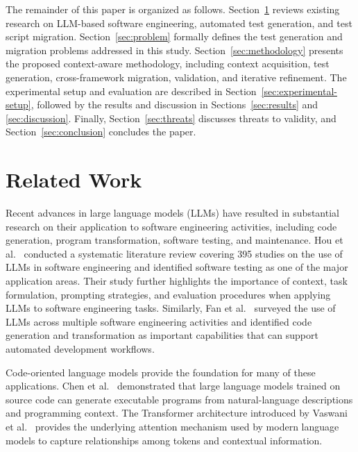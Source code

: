 \documentclass[pdflatex,sn-mathphys-num]{sn-jnl}
\begin{document}
The remainder of this paper is organized as follows. Section~\ref{sec:related-work}
reviews existing research on LLM-based software engineering, automated test
generation, and test script migration. Section~\ref{sec:problem} formally
defines the test generation and migration problems addressed in this study.
Section~\ref{sec:methodology} presents the proposed context-aware methodology,
including context acquisition, test generation, cross-framework migration,
validation, and iterative refinement. The experimental setup and evaluation
are described in Section~\ref{sec:experimental-setup}, followed by the
results and discussion in Sections~\ref{sec:results} and
\ref{sec:discussion}. Finally, Section~\ref{sec:threats} discusses threats to
validity, and Section~\ref{sec:conclusion} concludes the paper.


\section{Related Work}
\label{sec:related-work}

Recent advances in large language models (LLMs) have resulted in
substantial research on their application to software engineering
activities, including code generation, program transformation, software
testing, and maintenance. Hou et al.~\cite{hou2024llmslr} conducted a
systematic literature review covering 395 studies on the use of LLMs in
software engineering and identified software testing as one of the major
application areas. Their study further highlights the importance of
context, task formulation, prompting strategies, and evaluation procedures
when applying LLMs to software engineering tasks. Similarly,
Fan et al.~\cite{fan2023llmse} surveyed the use of LLMs across multiple
software engineering activities and identified code generation and
transformation as important capabilities that can support automated
development workflows.

Code-oriented language models provide the foundation for many of these
applications. Chen et al.~\cite{chen2021codex} demonstrated that
large language models trained on source code can generate executable
programs from natural-language descriptions and programming context.
The Transformer architecture introduced by Vaswani et al.~\cite{vaswani2017attention}
provides the underlying attention mechanism used by modern language models
to capture relationships among tokens and contextual information.
\end{document}

